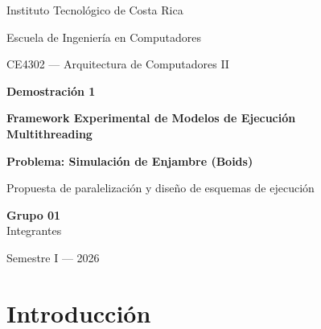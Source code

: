 \documentclass[11pt,a4paper]{article}
\begin{document}
\begin{titlepage}
\centering
\vspace*{2cm}

{\Large Instituto Tecnológico de Costa Rica\par}
\vspace{0.3cm}
{\large Escuela de Ingeniería en Computadores\par}
\vspace{0.3cm}
{\large CE4302 — Arquitectura de Computadores II\par}

\vspace{2cm}

{\LARGE\bfseries Demostración 1\\[0.3cm]}
{\LARGE\bfseries Framework Experimental de Modelos de Ejecución\\Multithreading\par}

\vspace{1.5cm}

{\Large\bfseries Problema: Simulación de Enjambre (Boids)\par}

\vspace{1cm}

{\large Propuesta de paralelización y diseño de esquemas de ejecución\par}

\vspace{3cm}

{\large\textbf{Grupo 01}\\[0.5cm]
Integrantes\par}

\vspace{2cm}

{\normalsize Semestre I — 2026\par}

\end{titlepage}

\tableofcontents
\newpage

\section{Introducción}
\end{document}
